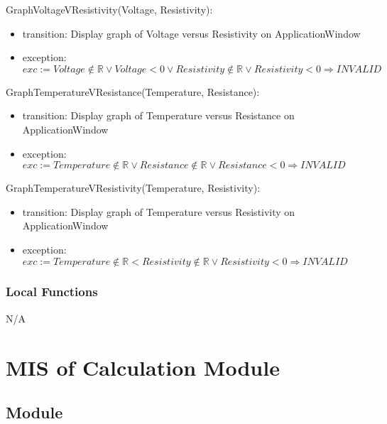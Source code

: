 \documentclass[12pt, titlepage]{article}
\begin{document}
\noindent GraphVoltageVResistivity(Voltage, Resistivity):
\begin{itemize}
\item transition: Display graph of Voltage versus Resistivity on ApplicationWindow
\item exception: $exc:= Voltage \notin  \mathbb{R} \lor Voltage < 0 \lor  Resistivity \notin  \mathbb{R} \lor Resistivity< 0\Rightarrow INVALID$
\end{itemize}

\noindent GraphTemperatureVResistance(Temperature, Resistance):
\begin{itemize}
\item transition: Display graph of Temperature versus Resistance on ApplicationWindow
\item exception: $exc:= Temperature \notin  \mathbb{R} \lor  Resistance \notin  \mathbb{R} \lor Resistance < 0\Rightarrow INVALID$
\end{itemize}

\noindent GraphTemperatureVResistivity(Temperature, Resistivity):
\begin{itemize}
\item transition: Display graph of Temperature versus Resistivity on ApplicationWindow
\item exception: $exc:= Temperature \notin  \mathbb{R} <  Resistivity \notin  \mathbb{R} \lor Resistivity < 0\Rightarrow INVALID$
\end{itemize}

\subsubsection{Local Functions}

N/A

\newpage


\section{MIS of Calculation Module} \label{Module} 



\subsection{Module}
\end{document}
